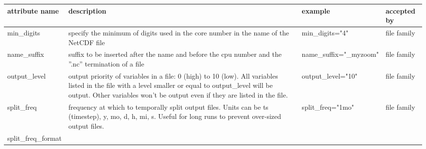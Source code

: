 \documentclass[../main/NEMO_manual]{subfiles}
\begin{document}
\begin{table}
  \scriptsize
  \begin{tabularx}{\textwidth}{|l|X|l|l|}
    \hline
    attribute name                                                                                       &
    description                                                                                          &
    example                                                                                              &
    accepted by                            \\
    \hline
    \hline
    min\_digits                                                                                          &
    specify the minimum of digits used in the core number in the name of the NetCDF file                 &
    min\_digits="4"                                                                                      &
    file family                            \\
    \hline
    name\_suffix                                                                                         &
    suffix to be inserted after the name and before the cpu number and the ''.nc'' termination of a file &
    name\_suffix="\_myzoom"                                                                              &
    file family                            \\
    \hline
    output\_level                                                                                        &
    output priority of variables in a file: 0 (high) to 10 (low).
    All variables listed in the file with a level smaller or equal to output\_level will be output.
    Other variables won't be output even if they are listed in the file.                                 &
    output\_level="10"                                                                                   &
    file family                            \\
    \hline
    split\_freq                                                                                          &
    frequency at which to temporally split output files.
    Units can be ts (timestep), y, mo, d, h, mi, s.
    Useful for long runs to prevent over-sized output files.                                             &
    split\_freq="1mo"                                                                                    &
    file family                            \\
    \hline
    split\_freq\-\_format                                                                                &

\end{tabularx}
\end{table}
\end{document}

